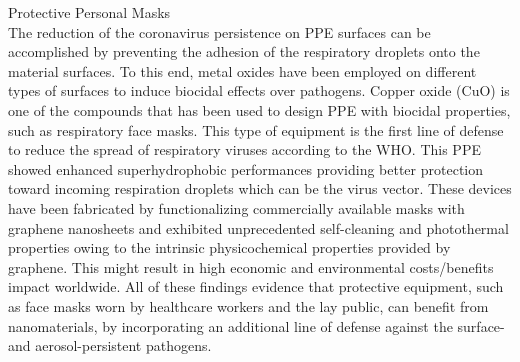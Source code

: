 \documentclass[12pt]{article}
\begin{document}
\indent

{\large Protective Personal Masks}
\\
The reduction of the coronavirus persistence on PPE surfaces can be accomplished by preventing the adhesion of the respiratory droplets onto the material surfaces. To this end, metal oxides have been employed on different types of surfaces to induce biocidal effects over pathogens. Copper oxide (CuO) is one of the compounds that has been used to design PPE with biocidal properties, such as respiratory face masks. This type of equipment is the first line of defense to reduce the spread of respiratory viruses according to the WHO. 
This PPE showed enhanced superhydrophobic performances providing better protection toward incoming respiration droplets which can be the virus vector. These devices have been fabricated by functionalizing commercially available masks with graphene nanosheets and exhibited unprecedented self-cleaning and photothermal properties owing to the intrinsic physicochemical properties provided by graphene. This might result in high economic and environmental costs/benefits impact worldwide. All of these findings evidence that protective equipment, such as face masks worn by healthcare workers and the lay public, can benefit from nanomaterials, by incorporating an additional line of defense against the surface- and aerosol-persistent pathogens.

\indent
\end{document}
